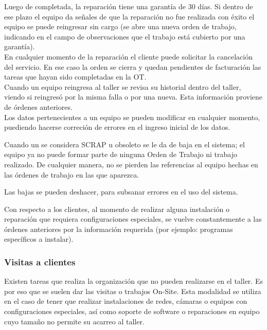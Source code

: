 \documentclass[12pt]{extarticle}
\begin{document}
\begin{spacing}{1.2}
    Luego de completada, la reparación tiene una garantía de 30 días. Si dentro de ese plazo el equipo da señales de que la reparación no fue realizada con éxito el equipo se puede reingresar sin cargo (se abre una nueva orden de trabajo, indicando en el campo de observaciones que el trabajo está cubierto por una garantía). \\
    
    En cualquier momento de la reparación el cliente puede solicitar la cancelación del servicio. En ese caso la orden se cierra y quedan pendientes de facturación las tareas que hayan sido completadas en la OT.\\

    Cuando un equipo reingresa al taller se revisa su historial dentro del taller, viendo si reingresó por la misma falla o por una nueva. Esta información proviene de órdenes anteriores. \\

    Los datos pertenecientes a un equipo se pueden modificar en cualquier momento, puediendo hacerse correción de errores en el ingreso inicial de los datos.

    Cuando un se considera SCRAP u obsoleto se le da de baja en el sistema; el equipo ya no puede formar parte de ninguna Orden de Trabajo ni trabajo realizado. De cualquier manera, no se pierden las referencias al equipo hechas en las órdenes de trabajo en las que aparezca.

    Las bajas se pueden deshacer, para subsanar errores en el uso del sistema.

    Con respecto a los clientes, al momento de realizar alguna instalación o reparación que requiera configuraciones especiales, se vuelve constantemente a las órdenes anteriores por la información requerida (por ejemplo: programas específicos a instalar).

    \subsubsection{Visitas a clientes}

    Existen tareas que realiza la organización que no pueden realizarse en el taller. Es por eso que se suelen dar las visitas o trabajos On-Site. Esta modalidad se utiliza en el caso de tener que realizar instalaciones de redes, cámaras o equipos con configuraciones especiales, así como soporte de software o reparaciones en equipo cuyo tamaño no permite su acarreo al taller.\\


\end{spacing}
\end{document}
